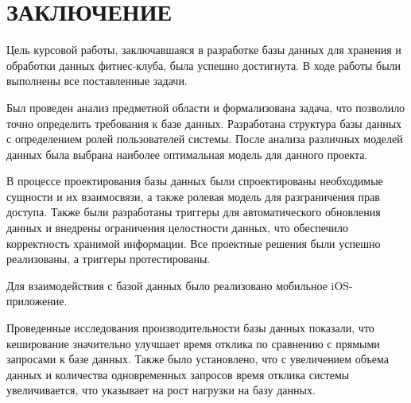 \section*{ЗАКЛЮЧЕНИЕ}

Цель курсовой работы, заключавшаяся в разработке базы данных для хранения и обработки данных фитнес-клуба, была успешно достигнута. В ходе работы были выполнены все поставленные задачи.

Был проведен анализ предметной области и формализована задача, что позволило точно определить требования к базе данных. Разработана структура базы данных с определением ролей пользователей системы. После анализа различных моделей данных была выбрана наиболее оптимальная модель для данного проекта.

В процессе проектирования базы данных были спроектированы необходимые сущности и их взаимосвязи, а также ролевая модель для разграничения прав доступа. Также были разработаны триггеры для автоматического обновления данных и внедрены ограничения целостности данных, что обеспечило корректность хранимой информации. Все проектные решения были успешно реализованы, а триггеры протестированы.

Для взаимодействия с базой данных было реализовано мобильное iOS-приложение.

Проведенные исследования производительности базы данных показали, что кеширование значительно улучшает время отклика по сравнению с прямыми запросами к базе данных. Также было установлено, что с увеличением объема данных и количества одновременных запросов время отклика системы увеличивается, что указывает на рост нагрузки на базу данных.